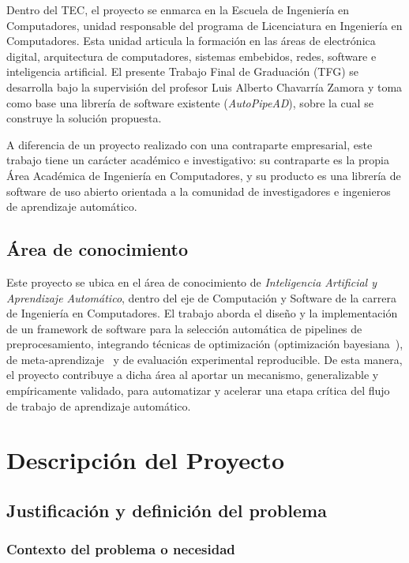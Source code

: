 \documentclass[12pt,letterpaper]{article}
\begin{document}
Dentro del TEC, el proyecto se enmarca en la Escuela de Ingeniería en Computadores, unidad responsable del programa de Licenciatura en Ingeniería en Computadores. Esta unidad articula la formación en las áreas de electrónica digital, arquitectura de computadores, sistemas embebidos, redes, software e inteligencia artificial. El presente Trabajo Final de Graduación (TFG) se desarrolla bajo la supervisión del profesor Luis Alberto Chavarría Zamora y toma como base una librería de software existente (\textit{AutoPipeAD}), sobre la cual se construye la solución propuesta.

A diferencia de un proyecto realizado con una contraparte empresarial, este trabajo tiene un carácter académico e investigativo: su contraparte es la propia Área Académica de Ingeniería en Computadores, y su producto es una librería de software de uso abierto orientada a la comunidad de investigadores e ingenieros de aprendizaje automático.

\subsection{Área de conocimiento}

Este proyecto se ubica en el área de conocimiento de \textit{Inteligencia Artificial y Aprendizaje Automático}, dentro del eje de Computación y Software de la carrera de Ingeniería en Computadores. El trabajo aborda el diseño y la implementación de un framework de software para la selección automática de pipelines de preprocesamiento, integrando técnicas de optimización (optimización bayesiana~\cite{snoek2012practical}), de meta-aprendizaje~\cite{vanschoren2018metalearning} y de evaluación experimental reproducible. De esta manera, el proyecto contribuye a dicha área al aportar un mecanismo, generalizable y empíricamente validado, para automatizar y acelerar una etapa crítica del flujo de trabajo de aprendizaje automático.

\section{Descripción del Proyecto}

\subsection{Justificación y definición del problema}

\subsubsection{Contexto del problema o necesidad}
\end{document}
